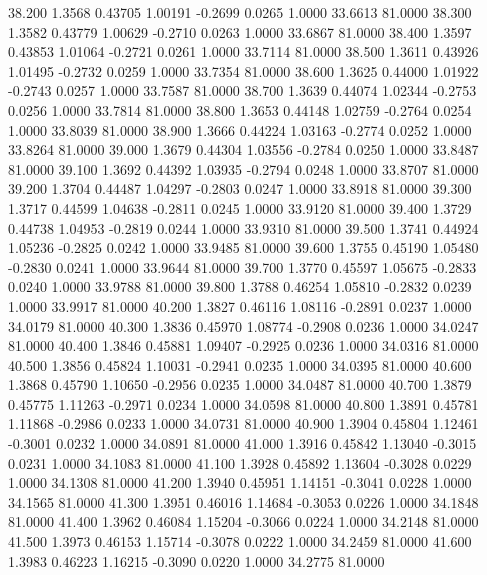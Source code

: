   38.200   1.3568   0.43705   1.00191  -0.2699   0.0265   1.0000  33.6613  81.0000
  38.300   1.3582   0.43779   1.00629  -0.2710   0.0263   1.0000  33.6867  81.0000
  38.400   1.3597   0.43853   1.01064  -0.2721   0.0261   1.0000  33.7114  81.0000
  38.500   1.3611   0.43926   1.01495  -0.2732   0.0259   1.0000  33.7354  81.0000
  38.600   1.3625   0.44000   1.01922  -0.2743   0.0257   1.0000  33.7587  81.0000
  38.700   1.3639   0.44074   1.02344  -0.2753   0.0256   1.0000  33.7814  81.0000
  38.800   1.3653   0.44148   1.02759  -0.2764   0.0254   1.0000  33.8039  81.0000
  38.900   1.3666   0.44224   1.03163  -0.2774   0.0252   1.0000  33.8264  81.0000
  39.000   1.3679   0.44304   1.03556  -0.2784   0.0250   1.0000  33.8487  81.0000
  39.100   1.3692   0.44392   1.03935  -0.2794   0.0248   1.0000  33.8707  81.0000
  39.200   1.3704   0.44487   1.04297  -0.2803   0.0247   1.0000  33.8918  81.0000
  39.300   1.3717   0.44599   1.04638  -0.2811   0.0245   1.0000  33.9120  81.0000
  39.400   1.3729   0.44738   1.04953  -0.2819   0.0244   1.0000  33.9310  81.0000
  39.500   1.3741   0.44924   1.05236  -0.2825   0.0242   1.0000  33.9485  81.0000
  39.600   1.3755   0.45190   1.05480  -0.2830   0.0241   1.0000  33.9644  81.0000
  39.700   1.3770   0.45597   1.05675  -0.2833   0.0240   1.0000  33.9788  81.0000
  39.800   1.3788   0.46254   1.05810  -0.2832   0.0239   1.0000  33.9917  81.0000
  40.200   1.3827   0.46116   1.08116  -0.2891   0.0237   1.0000  34.0179  81.0000
  40.300   1.3836   0.45970   1.08774  -0.2908   0.0236   1.0000  34.0247  81.0000
  40.400   1.3846   0.45881   1.09407  -0.2925   0.0236   1.0000  34.0316  81.0000
  40.500   1.3856   0.45824   1.10031  -0.2941   0.0235   1.0000  34.0395  81.0000
  40.600   1.3868   0.45790   1.10650  -0.2956   0.0235   1.0000  34.0487  81.0000
  40.700   1.3879   0.45775   1.11263  -0.2971   0.0234   1.0000  34.0598  81.0000
  40.800   1.3891   0.45781   1.11868  -0.2986   0.0233   1.0000  34.0731  81.0000
  40.900   1.3904   0.45804   1.12461  -0.3001   0.0232   1.0000  34.0891  81.0000
  41.000   1.3916   0.45842   1.13040  -0.3015   0.0231   1.0000  34.1083  81.0000
  41.100   1.3928   0.45892   1.13604  -0.3028   0.0229   1.0000  34.1308  81.0000
  41.200   1.3940   0.45951   1.14151  -0.3041   0.0228   1.0000  34.1565  81.0000
  41.300   1.3951   0.46016   1.14684  -0.3053   0.0226   1.0000  34.1848  81.0000
  41.400   1.3962   0.46084   1.15204  -0.3066   0.0224   1.0000  34.2148  81.0000
  41.500   1.3973   0.46153   1.15714  -0.3078   0.0222   1.0000  34.2459  81.0000
  41.600   1.3983   0.46223   1.16215  -0.3090   0.0220   1.0000  34.2775  81.0000
